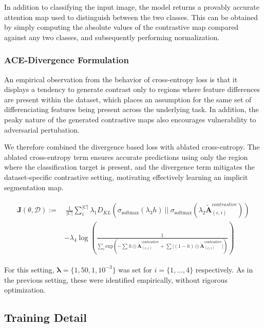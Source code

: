 \documentclass{article}
\theoremstyle{plain}
\theoremstyle{definition}
\theoremstyle{remark}
\begin{document}
In addition to classifying the input image, the model returns a provably accurate attention map used to distinguish between the two classes. This can be obtained by simply computing the absolute values of the contrastive map compared against any two classes, and subsequently performing normalization.

\subsubsection{ACE-Divergence Formulation}

An empirical observation from the behavior of cross-entropy loss is that it displays a tendency to generate contrast only to regions where feature differences are present within the dataset, which places an assumption for the same set of differenciating features being present across the underlying task. In addition, the peaky nature of the generated contrastive maps also encourages vulnerability to adversarial pertubation.

We therefore combined the divergence based loss with ablated cross-entropy. The ablated cross-entropy term ensures accurate predictions using only the region where the classification target is present, and the divergence term mitigates the dataset-specific contrastive setting, motivating effectively learning an implicit segmentation map.

\begin{gather}
	\begin{split}
		\mathcal{\bm{J}}(\theta, \mathcal{D}) := &\ \frac{1}{|C|} \sum^{|C|}_{i} \lambda_1 D_{KL}(\sigma_{\text{softmax}}(\lambda_3 h)\ ||\ \sigma_{\text{softmax}}(\lambda_2 \tilde{\mathcal{\bm{A}}}^{\textit{contrastive}}_{(c, i)})) \\
		&- \lambda_4 \log \left( \frac{1}{\sum_i \text{exp}\left({-\sum^{}h \odot \tilde{\mathcal{\bm{A}}}^{\text{contrastive}}_{(c, i)} + \sum |(1-h) \odot \tilde{\mathcal{\bm{A}}}^{\text{contrastive}}_{(c, i)}}|\right)} \right)
	\end{split}
\end{gather}

For this setting, $\bm{\lambda} = \{1, 50, 1, 10^{-3}\}$ was set for $i = \{1, \ldots, 4\}$ respectively. As in the previous setting, these were identified empirically, without rigorous optimization.

\subsection{Training Detail}
\end{document}

